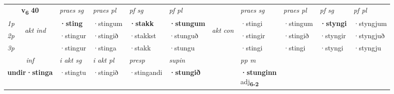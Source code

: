 \noindent
\begin{tabular}{lllllllllll} \toprule
\multicolumn{2}{c}{\textbf{v{\textsubscript{6}}} \Large{\textbf{40}}}  &  \textit{praes sg}  & \textit{praes pl}  &\textit{ pf sg} & \textit{pf pl} &  &  \textit{praes sg}  & \textit{praes pl}  & \textit{pf sg} & \textit{pf pl } \\*
	\cmidrule{3-6} \cmidrule{8-11}
 {\textit{1p}} & \multirow{3}{*}{\begin{turn}{90}\textit{akt ind}\end{turn}} & \textbf{·sting} & ·stingum & \textbf{·stakk} & \textbf{·stungum} & \multirow{3}{*}{\begin{turn}{90}\textit{akt con}\end{turn}} &·stingi & ·stingum & \textbf{·styngi} & ·styngjum\\*
 {\textit{2p}} &  &  ·stingur  & ·stingið & ·stakkst & ·stunguð & & ·stingir & ·stingið & ·styngir & ·styngjuð \\*
{\textit{3p}} &  & ·stingur & ·stinga & ·stakk & ·stungu & & ·stingi & ·stingi& ·styngi & ·styngju \\*
\cmidrule{3-6} \cmidrule{8-11}

   \multicolumn{2}{c}{\textit{inf}}  & \textit{i akt sg} & \textit{i akt pl}   & \textit{presp} & \textit{supin}  && \textit{pp m} \\*
  \multicolumn{2}{c}{\textbf{undir\allowbreak ·stinga}} & ·stingtu  & ·stingið   & ·stingandi &  \textbf{·stungið}  && \specialcell{\textbf{·stunginn} \\ adj\textbf{\textsubscript{6-2}}} \\*
\end{tabular}

